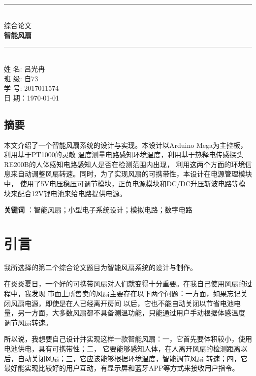 \documentclass{article}
\begin{document}
\begin{spacing}{1.5}

    \thispagestyle{empty}
    \begin{center}
~\\[6cm]\rule{\linewidth}{0.5mm} \\[6mm]
{\Large 综合论文  \\  \textbf{{\LARGE 智能风扇}}  \\[6mm]}
\rule{\linewidth}{0.5mm} \\[2cm]
{\Large 姓 名: 吕光冉}\\[.3cm]
{\Large 班 级:   自73 }\\[.3cm]
{\Large 学 号:  2017011574}\\[.3cm]
{\Large 日 期：\today }\\[.3cm]
    \end{center}

    \clearpage
    \phantom{s}

\tableofcontents
\newpage

    \subsection{摘要}

    本文介绍了一个智能风扇系统的设计与实现。本设计以Arduino Mega为主控板，利用基于PT1000的灵敏
    温度测量电路感知环境温度，利用基于热释电传感探头RE200B的人体感知电路感知人是否在检测范围内出现，
    利用这两个方面的环境信息来自动调整风扇转速。同时，为了实现风扇的可携带性，本设计在电源管理模块中，
    使用了5V电压稳压可调节模块，正负电源模块和DC/DC升压斩波电路等模块来配合12V锂电池来给电路提供电源。

    \textbf{关键词} ：智能风扇；小型电子系统设计；模拟电路；数字电路

\section{引言}

   我所选择的第二个综合论文题目为智能风扇系统的设计与制作。
    
   在炎炎夏日，一个好的可携带风扇对人们就变得十分重要。在我自己使用风扇的过程中，我发现
   市面上所售卖的风扇主要存在以下两个问题：一方面，如果忘记关闭风扇电源，即使是在人已经离开房间
   以后，它也不能自动关闭以节省电池电量，另一方面，大多数风扇都不具备测温功能，只能通过用户手动根据体感温度
   调节风扇转速。

    所以说，我想要自己设计并实现这样一款智能风扇：一，它首先要体积较小，使用电池供电，具有可携带性；二，
    它要能够感知人体，在人离开风扇的检测距离以后，自动关闭风扇；三，它应该能够根据环境温度，智能调节风扇
    转速；四，它最好能实现比较好的用户互动，有显示屏和蓝牙APP等方式来接收用户指令。


\end{spacing}
\end{document}
